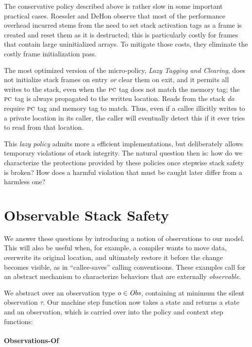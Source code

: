 \documentclass[10pt,conference]{ieeetran}%
\theoremstyle{definition}
\begin{document}
{The conservative policy described above is rather slow in
some important practical cases. Roessler and DeHon\cite{DBLP:conf/sp/RoesslerD18} observe
that most of the performance overhead incurred
stems from the need to set stack activation tags as a frame is created
and reset them as it is destructed;  this
is particularly costly for frames that contain large uninitialized arrays.
To mitigate those costs, they eliminate the costly frame initialization pass.

The most optimized version of the micro-policy, {\em Lazy Tagging and Clearing},
does not initialize stack frames on entry \emph{or} clear them on exit,
and it permits all writes to the stack, even when the $\textsc{pc}$ tag
does not match the memory tag; the \(\textsc{pc}\) tag is always propagated
to the written location. Reads from the stack \emph{do} require $\textsc{pc}$
tag and memory tag to match. Thus, even if a callee illicitly writes to
a private location in its caller, the caller will eventually detect this
if it ever tries to read from that location.

This \emph{lazy policy} admits more a efficient implementations, but
deliberately allows temporary violations of stack integrity.
The natural question then is: how do we characterize the
protections provided by these policies once stepwise stack safety is broken?
How does a harmful violation that must be caught later differ from a
harmless one?

\section{Observable Stack Safety}
\label{sec:lazy}

We answer these questions by introducing a notion of observations to our model.
This will also be useful when, for example,
a compiler wants to move data, overwrite its original location,
and ultimately restore it before the change becomes visible, as in
``callee-saves'' calling conventioons.
These examples call for an abstract mechanism to characterize behaviors that are externally
\emph{observable}.

We abstract over an
observation type \(o \in \mathit{Obs}\), containing at minimum the silent observation
\(\tau\). Our machine step function now takes a state and returns a state and an observation,
which is carried over into the policy and context step functions:

\paragraph*{Observations-Of}

}
\end{document}
